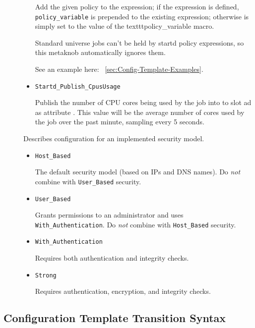 \begin{description}
\begin{itemize}
	Add the given policy to the  expression; if the
	 expression is defined, \texttt{policy\_variable}
	is prepended to the existing expression; otherwise
	 is simply set to the value of the
	texttt{policy\_variable} macro.

	Standard universe jobs can't be held by startd policy expressions,
	so this metaknob automatically ignores them.

	See an example here: ~\ref{sec:Config-Template-Examples}.

	\item \texttt{Startd\_Publish\_CpusUsage}

	Publish the number of CPU cores being used by the job into
	to slot ad as attribute . This value will
	be the average number of cores used by the job over the
	past minute, sampling every 5 seconds.
  \end{itemize}

\label{usecategory:SECURITY}
\item[\MacroNI{SECURITY category}]
  Describes configuration for an implemented security model.
  \begin{itemize}
    \item \texttt{Host\_Based}

    The default security model (based on IPs and DNS names).
    Do \emph{not} combine with \texttt{User\_Based} security.

    \item \texttt{User\_Based}

    Grants permissions to an administrator and uses 
    \texttt{With\_Authentication}.
    Do \emph{not} combine with \texttt{Host\_Based} security.

    \item \texttt{With\_Authentication}

    Requires both authentication and integrity checks.

    \item \texttt{Strong}

    Requires authentication, encryption, and integrity checks.
  \end{itemize}

\end{description}

\subsection{\label{sec:Config-Template-Transition-Syntax}Configuration
Template Transition Syntax}

